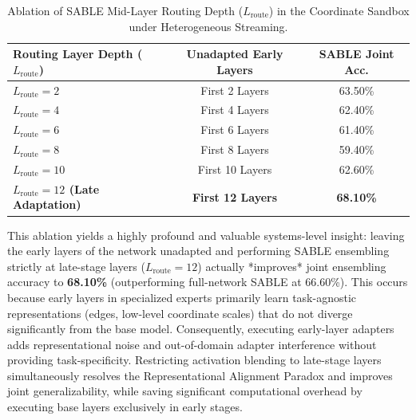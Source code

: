 \begin{itemize}
    \begin{table}[htbp]
    \caption{Ablation of SABLE Mid-Layer Routing Depth ($L_{\text{route}}$) in the Coordinate Sandbox under Heterogeneous Streaming.}
    \label{tab:mid_layer_routing_ablation}
    \vskip 0.1in
    \begin{center}
    \begin{small}
    \begin{sc}
    \begin{tabular}{lcc}
    \toprule
    Routing Layer Depth ($L_{\text{route}}$) & Unadapted Early Layers & SABLE Joint Acc. \\
    \midrule
    $L_{\text{route}}=2$ & First 2 Layers & 63.50\% \\
    $L_{\text{route}}=4$ & First 4 Layers & 62.40\% \\
    $L_{\text{route}}=6$ & First 6 Layers & 61.40\% \\
    $L_{\text{route}}=8$ & First 8 Layers & 59.40\% \\
    $L_{\text{route}}=10$ & First 10 Layers & 62.60\% \\
    \textbf{$L_{\text{route}}=12$ (Late Adaptation)} & \textbf{First 12 Layers} & \textbf{68.10\%} \\
    \bottomrule
    \end{tabular}
    \end{sc}
    \end{small}
    \end{center}
    \vskip -0.1in
    \end{table}
    
    This ablation yields a highly profound and valuable systems-level insight: leaving the early layers of the network unadapted and performing SABLE ensembling strictly at late-stage layers ($L_{\text{route}} = 12$) actually *improves* joint ensembling accuracy to \textbf{68.10\%} (outperforming full-network SABLE at 66.60\%). This occurs because early layers in specialized experts primarily learn task-agnostic representations (edges, low-level coordinate scales) that do not diverge significantly from the base model. Consequently, executing early-layer adapters adds representational noise and out-of-domain adapter interference without providing task-specificity. Restricting activation blending to late-stage layers simultaneously resolves the Representational Alignment Paradox and improves joint generalizability, while saving significant computational overhead by executing base layers exclusively in early stages.


\end{itemize}
